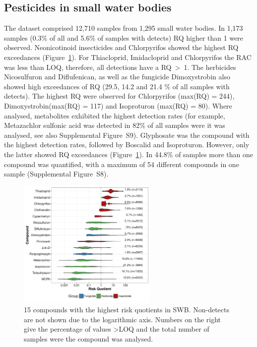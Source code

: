 \documentclass[journal=esthag,manuscript=article]{achemso}
\begin{document}
\subsection{Pesticides in small water bodies}
The dataset comprised 12,710 samples from 1,295 small water bodies.
In 1,173 samples (0.3\% of all and 5.6\% of samples with detects) RQ higher than 1 were observed.
Neonicotinoid insecticides and Chlorpyrifos showed the highest RQ exceedances (Figure~\ref{fig:fig6}).
For Thiacloprid, Imidacloprid and Chlorpyrifos the RAC was less than LOQ, therefore, all detections have a RQ~\textgreater~1. 
The herbicides Nicosulfuron and Diflufenican, as well as the fungicide Dimoxystrobin also showed high exceedances of RQ (29.5, 14.2 and 21.4 \% of all samples with detects).
The highest RQ were observed for Chlorpyrifos (max(RQ) = 244), Dimoxystrobin(max(RQ) = 117) and Isoproturon (max(RQ) = 80). 
Where analysed, metabolites exhibited the highest detection rates (for example, Metazachlor sulfonic acid was detected in 82\% of all samples were it was analysed, see also Supplemental Figure~S9).
Glyphosate was the compound with the highest detection rates, followed by Boscalid and Isoproturon. 
However, only the latter showed RQ exceedances (Figure~\ref{fig:fig6}).
In 44.8\% of samples more than one compound was quantified, with a maximum of 54 different compounds in one sample (Supplemental Figure~S8). 

\begin{figure}[ht]
  \includegraphics[width=0.6\textwidth]{figure6.pdf}
  \caption{15 compounds with the highest risk quotients in SWB. Non-detects are not shown due to the logarithmic axis. Numbers on the right give the percentage of values \textgreater LOQ and the total number of samples were the compound was analysed.
  }
  \label{fig:fig6}
\end{figure}
\end{document}
